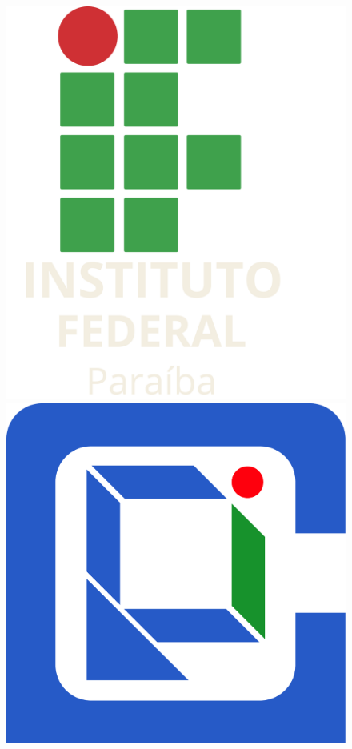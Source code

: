 \documentclass[t]{beamer}
\begin{document}
\begin{darkframes}
\begin{frame}
    \begin{figure}[b]
      \includegraphics[width=.25\textwidth]{./fibeamer/logo/zut/ifpb.png}
      \hspace{1cm}
      \includegraphics[width=.25\textwidth]{./fibeamer/logo/zut/gcompi.png}
    \end{figure}
  \end{frame}


\end{darkframes}
\end{document}
